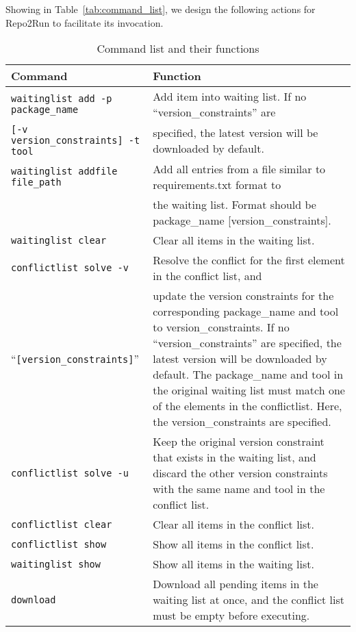 Showing in Table~\ref{tab:command_list}, we design the following actions for Repo2Run to facilitate its invocation.

\begin{table}[htbp]
    \centering
    \caption{Command list and their functions}
    \begin{tabular}{|l|p{9cm}|}
        \hline
        \textbf{Command} & \textbf{Function} \\
        \hline
        \texttt{waitinglist add -p package\_name} & Add item into waiting list. If no ``version\_constraints'' are\\
        \texttt{[-v version\_constraints] -t tool} & specified, the latest version will be downloaded by default. \\
        \hline
        \texttt{waitinglist addfile file\_path} & Add all entries from a file similar to requirements.txt format to\\
        & the waiting list. Format should be package\_name [version\_constraints]. \\
        \hline
        \texttt{waitinglist clear} & Clear all items in the waiting list. \\
        \hline
        \texttt{conflictlist solve -v} & Resolve the conflict for the first element in the conflict list, and \\
        ``\texttt{[version\_constraints]}'' & update the version constraints for the corresponding package\_name and tool to version\_constraints. If no ``version\_constraints'' are specified, the latest version will be downloaded by default. The package\_name and tool in the original waiting list must match one of the elements in the conflictlist. Here, the version\_constraints are specified. \\
        \hline
        \texttt{conflictlist solve -u} & Keep the original version constraint that exists in the waiting list, and discard the other version constraints with the same name and tool in the conflict list. \\
        \hline
        \texttt{conflictlist clear} & Clear all items in the conflict list. \\
        \hline
        \texttt{conflictlist show} & Show all items in the conflict list. \\
        \hline
        \texttt{waitinglist show} & Show all items in the waiting list. \\
        \hline
        \texttt{download} & Download all pending items in the waiting list at once, and the conflict list must be empty before executing. \\

\end{tabular}
\end{table}
